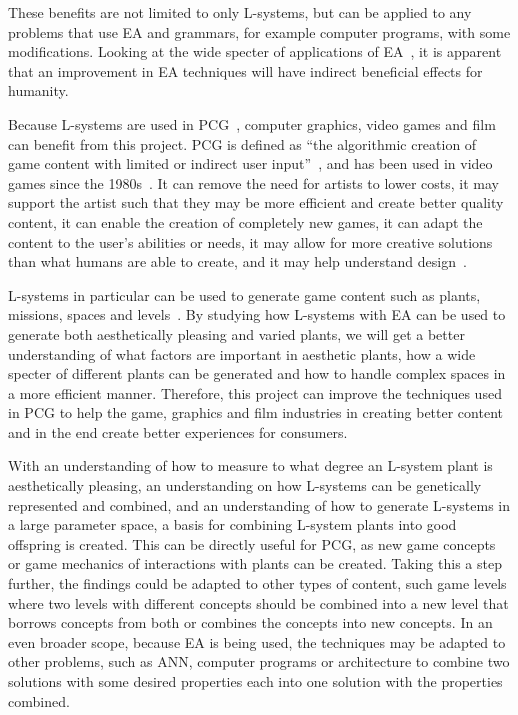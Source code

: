 These benefits are not limited to only \glspl{L-system}, but can be applied to any problems that use \gls{EA} and grammars, for example computer programs, with some modifications.
Looking at the wide specter of applications of \gls{EA}~\cite{2006AshlockEA}, it is apparent that an improvement in \gls{EA} techniques will have indirect beneficial effects for humanity.

Because \glspl{L-system} are used in \gls{PCG}~\cite{PCG_5}, computer graphics, video games and film can benefit from this project.
\Gls{PCG} is defined as ``the algorithmic creation of game content with limited or indirect user input''~\cite{2011Togelius}, and has been used in video games since the 1980s~\cite{PCG_1}.
It can remove the need for artists to lower costs, it may support the artist such that they may be more efficient and create better quality content, it can enable the creation of completely new games, it can adapt the content to the user's abilities or needs, it may allow for more creative solutions than what humans are able to create, and it may help understand design~\cite{PCG_1}.

\Glspl{L-system} in particular can be used to generate game content such as plants, missions, spaces and levels~\cite{PCG_5}.
By studying how \glspl{L-system} with \gls{EA} can be used to generate both aesthetically pleasing and varied plants, we will get a better understanding of what factors are important in aesthetic plants, how a wide specter of different plants can be generated and how to handle complex spaces in a more efficient manner.
Therefore, this project can improve the techniques used in \gls{PCG} to help the game, graphics and film industries in creating better content and in the end create better experiences for consumers.

With an understanding of how to measure to what degree an L-system plant is aesthetically pleasing, an understanding on how L-systems can be genetically represented and combined, and an understanding of how to generate L-systems in a large parameter space, a basis for combining L-system plants into good offspring is created.
This can be directly useful for \gls{PCG}, as new game concepts or game mechanics of interactions with plants can be created.
Taking this a step further, the findings could be adapted to other types of content, such game levels where two levels with different concepts should be combined into a new level that borrows concepts from both or combines the concepts into new concepts.
In an even broader scope, because \gls{EA} is being used, the techniques may be adapted to other problems, such as \gls{ANN}, computer programs or architecture to combine two solutions with some desired properties each into one solution with the properties combined.

